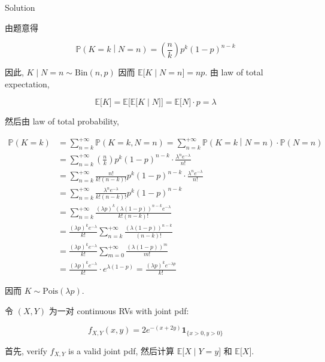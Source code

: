 \documentclass{qlnotes-export}
\begin{document}
\begin{qlsolution}{Solution}

由题意得

\[\left. {\mathbb{P}}(K = k \middle| N = n) = \left( \frac{n}{k} \right)p^{k}(1 - p)^{n - k} \right.\]

因此, \(\left. K \middle| N = n \sim \text{Bin}(n,p) \right.\) 因而 \(\left. {\mathbb{E}}\lbrack K \middle| N = n\rbrack = np \right.\). 由 law of total expectation,

\[\left. {\mathbb{E}}\lbrack K\rbrack = {\mathbb{E}}\lbrack{\mathbb{E}}\lbrack K \middle| N\rbrack\rbrack = {\mathbb{E}}\lbrack N\rbrack \cdot p = \lambda \right.\]

然后由 law of total probability,

\[\begin{matrix}
{{\mathbb{P}}(K = k)} & \left. = \sum\limits_{n = k}^{+ \infty}{\mathbb{P}}(K = k,N = n) = \sum\limits_{n = k}^{+ \infty}{\mathbb{P}}(K = k \middle| N = n) \cdot {\mathbb{P}}(N = n) \right. \\
 & {= \sum\limits_{n = k}^{+ \infty}\left( \frac{n}{k} \right)p^{k}(1 - p)^{n - k} \cdot \frac{\lambda^{n}e^{- \lambda}}{n!}} \\
 & {= \sum\limits_{n = k}^{+ \infty}\frac{n!}{k!(n - k)!}p^{k}(1 - p)^{n - k} \cdot \frac{\lambda^{n}e^{- \lambda}}{n!}} \\
 & {= \sum\limits_{n = k}^{+ \infty}\frac{\lambda^{n}e^{- \lambda}}{k!(n - k)!}p^{k}(1 - p)^{n - k}} \\
 & {= \sum\limits_{n = k}^{+ \infty}\frac{(\lambda p)^{k}(\lambda(1 - p))^{n - k}e^{- \lambda}}{k!(n - k)!}} \\
 & {= \frac{(\lambda p)^{k}e^{- \lambda}}{k!}\sum\limits_{n = k}^{+ \infty}\frac{(\lambda(1 - p))^{n - k}}{(n - k)!}} \\
 & {= \frac{(\lambda p)^{k}e^{- \lambda}}{k!}\sum\limits_{m = 0}^{+ \infty}\frac{(\lambda(1 - p))^{m}}{m!}} \\
 & {= \frac{(\lambda p)^{k}e^{- \lambda}}{k!} \cdot e^{\lambda(1 - p)} = \frac{(\lambda p)^{k}e^{- \lambda p}}{k!}}
\end{matrix}\]

因而 \(K \sim \text{Pois}(\lambda p)\).

\end{qlsolution}

\begin{example}\label{ex-03-joint-conditional-distribution-example-010}

令 \((X,Y)\) 为一对 continuous RVs with joint pdf:

\[f_{X,Y}(x,y) = 2e^{- (x + 2y)}\mathbf{1}_{\{{x > 0,y > 0}\}}\]

首先, verify \(f_{X,Y}\) is a valid joint pdf, 然后计算 \(\left. {\mathbb{E}}\lbrack X \middle| Y = y\rbrack \right.\) 和 \({\mathbb{E}}\lbrack X\rbrack\).

\end{example}
\end{document}
